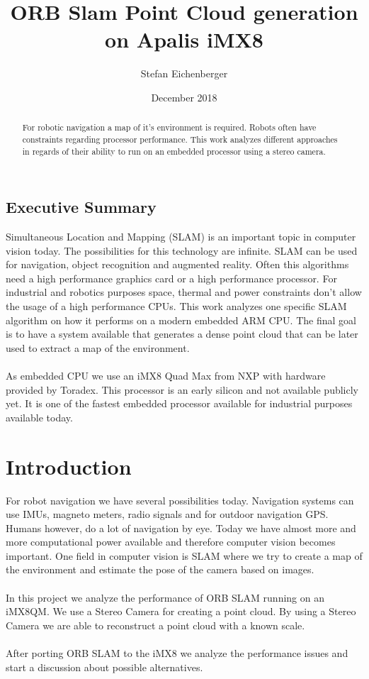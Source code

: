 \documentclass[11pt,a4paper,titlepage,oneside]{report}
\title{ORB Slam Point Cloud generation on Apalis iMX8}
\author{Stefan Eichenberger}
\date{December 2018}
\begin{document}
\maketitle

\begin{abstract}
	For robotic navigation a map of it's environment is required. Robots often have constraints regarding processor performance. This work analyzes different approaches in regards of their ability to run on an embedded processor using a stereo camera.
\end{abstract}

\section*{Executive Summary}
Simultaneous Location and Mapping (SLAM) is an important topic in computer vision today. The possibilities for this technology are infinite. SLAM can be used for navigation, object recognition and augmented reality. Often this algorithms need a high performance graphics card or a high performance processor. For industrial and robotics purposes space, thermal and power constraints don't allow the usage of a high performance CPUs. This work analyzes one specific SLAM algorithm on how it performs on a modern embedded ARM CPU. The final goal is to have a system available that generates a dense point cloud that can be later used to extract a map of the environment.\\\\
As embedded CPU we use an iMX8 Quad Max from NXP with hardware provided by Toradex. This processor is an early silicon and not available publicly yet. It is one of the fastest embedded processor available for industrial purposes available today.\\

\tableofcontents

\chapter{Introduction}
For robot navigation we have several possibilities today. Navigation systems can use IMUs, magneto meters, radio signals and for outdoor navigation GPS. Humans however, do a lot of navigation by eye. Today we have almost more and more computational power available and therefore computer vision becomes important. One field in computer vision is SLAM where we try to create a map of the environment and estimate the pose of the camera based on images.\\\\
In this project we analyze the performance of ORB SLAM \cite{orbslam} running on an iMX8QM. We use a Stereo Camera for creating a point cloud. By using a Stereo Camera we are able to reconstruct a point cloud with a known scale.\\\\
After porting ORB SLAM to the iMX8 we analyze the performance issues and start a discussion about possible alternatives.
\end{document}

